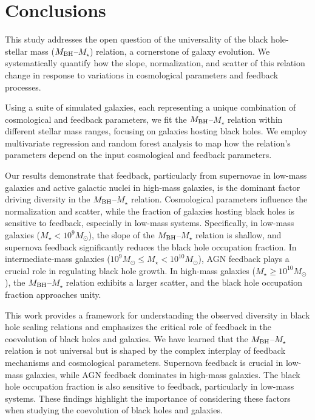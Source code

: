 \documentclass[twocolumn]{aastex631}
\begin{document}
\section{Conclusions}
\label{sec:conclusions}
This study addresses the open question of the universality of the black hole-stellar mass ($M_{\rm BH}$--$M_{\star}$) relation, a cornerstone of galaxy evolution. We systematically quantify how the slope, normalization, and scatter of this relation change in response to variations in cosmological parameters and feedback processes.

Using a suite of simulated galaxies, each representing a unique combination of cosmological and feedback parameters, we fit the $M_{\rm BH}$--$M_{\star}$ relation within different stellar mass ranges, focusing on galaxies hosting black holes. We employ multivariate regression and random forest analysis to map how the relation's parameters depend on the input cosmological and feedback parameters.

Our results demonstrate that feedback, particularly from supernovae in low-mass galaxies and active galactic nuclei in high-mass galaxies, is the dominant factor driving diversity in the $M_{\rm BH}$--$M_{\star}$ relation. Cosmological parameters influence the normalization and scatter, while the fraction of galaxies hosting black holes is sensitive to feedback, especially in low-mass systems. Specifically, in low-mass galaxies ($M_{\star} < 10^9 M_{\odot}$), the slope of the $M_{\rm BH}$--$M_{\star}$ relation is shallow, and supernova feedback significantly reduces the black hole occupation fraction. In intermediate-mass galaxies ($10^9 M_{\odot} \leq M_{\star} < 10^{10} M_{\odot}$), AGN feedback plays a crucial role in regulating black hole growth. In high-mass galaxies ($M_{\star} \geq 10^{10} M_{\odot}$), the $M_{\rm BH}$--$M_{\star}$ relation exhibits a larger scatter, and the black hole occupation fraction approaches unity.

This work provides a framework for understanding the observed diversity in black hole scaling relations and emphasizes the critical role of feedback in the coevolution of black holes and galaxies. We have learned that the $M_{\rm BH}$--$M_{\star}$ relation is not universal but is shaped by the complex interplay of feedback mechanisms and cosmological parameters. Supernova feedback is crucial in low-mass galaxies, while AGN feedback dominates in high-mass galaxies. The black hole occupation fraction is also sensitive to feedback, particularly in low-mass systems. These findings highlight the importance of considering these factors when studying the coevolution of black holes and galaxies.

{}

\end{document}

